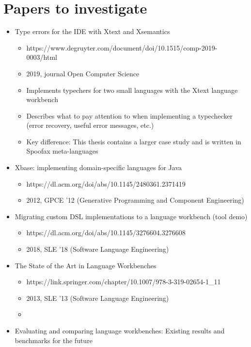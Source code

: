   \section{Papers to investigate}

    \begin{itemize}
      \item Type errors for the IDE with Xtext and Xsemantics
      \begin{itemize}
        \item https://www.degruyter.com/document/doi/10.1515/comp-2019-0003/html
        \item 2019, journal Open Computer Science
        \item Implements typechers for two small languages with the Xtext language workbench
        \item Describes what to pay attention to when implementing a typechecker (error recovery, useful error messages, etc.)
        \item Key difference: This thesis contains a larger case study and is written in Spoofax meta-languages
      \end{itemize}
      \item Xbase: implementing domain-specific languages for Java
      \begin{itemize}
        \item https://dl.acm.org/doi/abs/10.1145/2480361.2371419
        \item 2012, GPCE '12 (Generative Programming and Component Engineering)
      \end{itemize}
      \item Migrating custom DSL implementations to a language workbench (tool demo)
      \begin{itemize}
        \item https://dl.acm.org/doi/abs/10.1145/3276604.3276608
        \item 2018, SLE '18 (Software Language Engineering)
      \end{itemize}
      \item The State of the Art in Language Workbenches
      \begin{itemize}
        \item https://link.springer.com/chapter/10.1007/978-3-319-02654-1\_11
        \item 2013, SLE '13 (Software Language Engineering)
        \item 
      \end{itemize}
      \item Evaluating and comparing language workbenches: Existing results and benchmarks for the future

\end{itemize}
